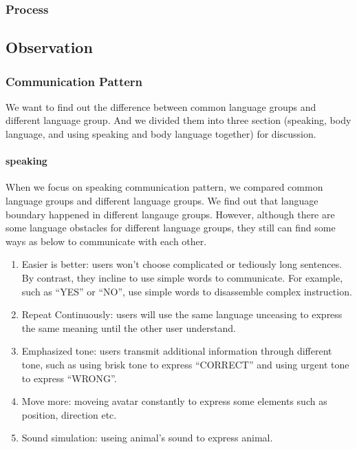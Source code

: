\subsubsection{Process}
\subsection{Observation}
\subsubsection{Communication Pattern}
We want to find out the difference between common language groups and different language group. And we divided them into three section (speaking, body language, and using speaking and body language together) for discussion.

\paragraph{speaking}
When we focus on speaking communication pattern, we compared common language groups and different language groups. We find out that language boundary happened in different langauge groups. However, although there are some language obstacles for different language groups, they still can find some ways as below to communicate with each other.

\begin{enumerate}
  \item Easier is better: users won't choose complicated or tediously long sentences. By contrast, they incline to use simple words to communicate. For example, such as ``YES'' or ``NO'', use simple words to disassemble complex instruction.

  \item Repeat Continuously: users will use the same language unceasing to express the same meaning until the other user understand.
  
  \item Emphasized tone: users transmit additional information through different tone, such as using brisk tone to express ``CORRECT'' and using urgent tone to express ``WRONG''.
  
  \item Move more: moveing avatar constantly to express some elements such as position, direction etc.
  
  \item Sound simulation: useing animal's sound to express animal.
\end{enumerate}

